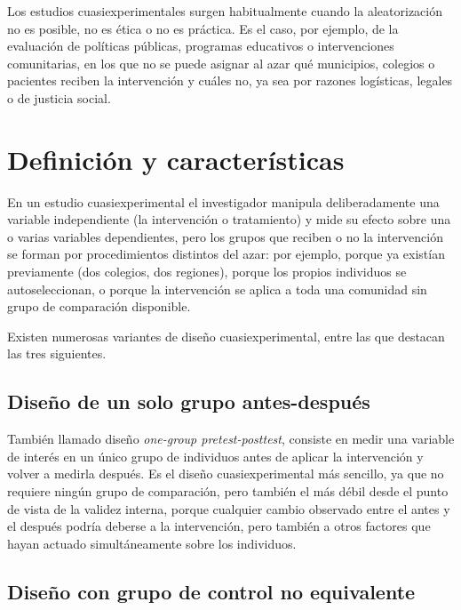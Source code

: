 \documentclass[
  spanish,
  a4paper,
]{scrreport}
\theoremstyle{definition}
\theoremstyle{definition}
\theoremstyle{remark}
\begin{document}
Los estudios cuasiexperimentales surgen habitualmente cuando la
aleatorización no es posible, no es ética o no es práctica. Es el caso,
por ejemplo, de la evaluación de políticas públicas, programas
educativos o intervenciones comunitarias, en los que no se puede asignar
al azar qué municipios, colegios o pacientes reciben la intervención y
cuáles no, ya sea por razones logísticas, legales o de justicia social.

\section{Definición y
características}\label{definiciuxf3n-y-caracteruxedsticas-6}

En un estudio cuasiexperimental el investigador manipula deliberadamente
una variable independiente (la intervención o tratamiento) y mide su
efecto sobre una o varias variables dependientes, pero los grupos que
reciben o no la intervención se forman por procedimientos distintos del
azar: por ejemplo, porque ya existían previamente (dos colegios, dos
regiones), porque los propios individuos se autoseleccionan, o porque la
intervención se aplica a toda una comunidad sin grupo de comparación
disponible.

Existen numerosas variantes de diseño cuasiexperimental, entre las que
destacan las tres siguientes.

\subsection{Diseño de un solo grupo
antes-después}\label{diseuxf1o-de-un-solo-grupo-antes-despuuxe9s}

También llamado diseño \emph{one-group pretest-posttest}, consiste en
medir una variable de interés en un único grupo de individuos antes de
aplicar la intervención y volver a medirla después. Es el diseño
cuasiexperimental más sencillo, ya que no requiere ningún grupo de
comparación, pero también el más débil desde el punto de vista de la
validez interna, porque cualquier cambio observado entre el antes y el
después podría deberse a la intervención, pero también a otros factores
que hayan actuado simultáneamente sobre los individuos.

\subsection{Diseño con grupo de control no
equivalente}\label{diseuxf1o-con-grupo-de-control-no-equivalente}
\end{document}
